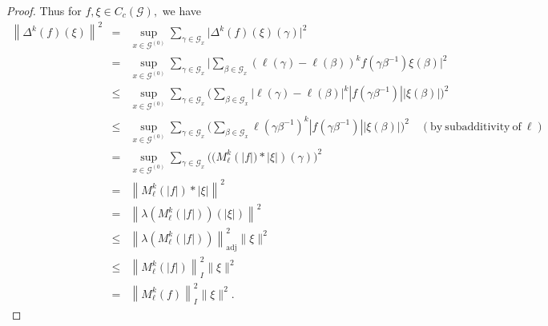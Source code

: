 \documentclass[a4paper,11pt,reqno]{amsart}
\theoremstyle{plain}
\theoremstyle{named}
\numberwithin{equation}{section}
\newcommand{\Bea}{\begin{eqnarray*}}
\newcommand{\Eea}{\end{eqnarray*}}
\newcommand{\hnorm}[1]{\left\lVert#1\right\rVert}
\begin{document}
\begin{proof}
				Thus for $f, \xi \in C_c (\mathcal G),$ we have
				\Bea
					\hnorm{\Delta^k (f) (\xi)}^2  & = & \sup\limits_{x \in \mathcal G^{(0)}} \sum\limits_{\gamma \in \mathcal G_x} \bigl \lvert \Delta^k (f) (\xi) (\gamma) \bigr \rvert^2 \\ & = &  \sup\limits_{x \in \mathcal G^{(0)}} \sum\limits_{\gamma \in \mathcal G_x} \biggl \lvert \sum\limits_{\beta \in \mathcal G_x} \left (\ell (\gamma) - \ell (\beta) \right )^k f \left (\gamma \beta^{-1} \right ) \xi (\beta) \biggr \rvert^2 \\ &
					\leq & \sup\limits_{x \in \mathcal G^{(0)}} \sum\limits_{\gamma \in \mathcal G_x} \biggl ( \sum\limits_{\beta \in \mathcal G_x} \left \lvert \ell (\gamma) - \ell (\beta) \right \rvert^k \left \lvert f \left (\gamma \beta^{-1} \right ) \right \rvert \left \lvert \xi (\beta) \right \rvert \biggr )^2 \\ & \leq &  \sup\limits_{x \in \mathcal G^{(0)}} \sum\limits_{\gamma \in \mathcal G_x} \biggl ( \sum\limits_{\beta \in \mathcal G_x} \ell \left (\gamma \beta^{-1} \right )^k \left \lvert f \left (\gamma \beta^{-1} \right ) \right \rvert \left \lvert \xi (\beta) \right \rvert \biggr )^2 \quad {(\mathrm{by\ subadditivity\ of}\ \ell)} \\
					 & = & \sup\limits_{x \in \mathcal G^{(0)}} \sum\limits_{\gamma \in \mathcal G_x} \biggl ( \bigl (M_{\ell}^k \left (\lvert f \rvert \bigr ) \ast \lvert \xi \rvert \right ) (\gamma) \biggr )^2 \\ & = & \left \|M_{\ell}^{k} \left (\lvert f \rvert  \right ) \ast \lvert \xi \rvert \right \|^2 \\ & = & \left \|\lambda \left (M_{\ell}^k \left (\lvert f \rvert \right )  \right )  \left (\lvert \xi \rvert \right ) \right \|^2 \\ & 
					 \leq & \left \|\lambda \left (M_{\ell}^k \left (\lvert f \rvert \right )  \right ) \right \|_{\mathrm {adj}}^2 \|\xi\|^2  \\ & \leq &  \left \|M_{\ell}^k \left (\lvert f \rvert \right ) \right \|_{I}^2 \|\xi\|^2  \\ & = &  \left \|M_{\ell}^k (f) \right \|_{I}^2 \|\xi\|^2.
				\Eea

\end{proof}
\end{document}
